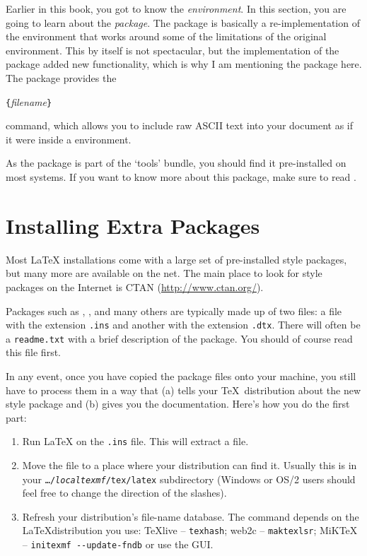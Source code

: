 Earlier in this book, you got to know the 
\emph{environment}.  In this section, you are going to learn about the
 \emph{package}. The  package is basically
a re-implementation of the  environment that works around
some of the limitations of the original  environment.
This by itself is not spectacular, but the implementation of the
 package added new functionality, which is
why I am mentioning the package here. The 
package provides the

\begin{lscommand}
\verb|{|\emph{filename}\verb|}|
\end{lscommand}

\noindent command, which allows you to include raw ASCII text into your
document as if it were inside a  environment.

As the  package is part of the `tools' bundle, you
should find it pre-installed on most systems. If you want to know more
about this package, make sure to read \cite{verbatim}.


\section{Installing Extra Packages}\label{sec:Packages}

Most \LaTeX{} installations come with a large set of pre-installed
style packages, but many more are available on the net. The main
place to look for style packages on the Internet is CTAN (\url{http://www.ctan.org/}).

Packages such as , , and many
others are typically made up of two files: a file with the extension
\texttt{.ins} and another with the extension \texttt{.dtx}. There
will often be a \texttt{readme.txt} with a brief description of the
package. You should of course read this file first.

In any event, once you have copied the package files onto your
machine, you still have to process them in a way that (a) tells your
\TeX\ distribution about the new style package and (b) gives you
the documentation.  Here's how you do the first part:

\begin{enumerate}
\item Run \LaTeX{} on the \texttt{.ins} file. This will
  extract a  file.
\item Move the  file to a place where your distribution
  can find it. Usually this is in your \texttt{\ldots/\emph{localtexmf}/tex/latex}
  subdirectory (Windows or OS/2 users should feel free to change the
  direction of the slashes).
\item Refresh your distribution's file-name database. The command
  depends on the \LaTeX distribution you use:
  \TeX{}live -- \texttt{texhash}; web2c -- \texttt{maktexlsr};
  MiK\TeX{} -- \texttt{initexmf -{}-update-fndb} or use the GUI.
\end{enumerate}

